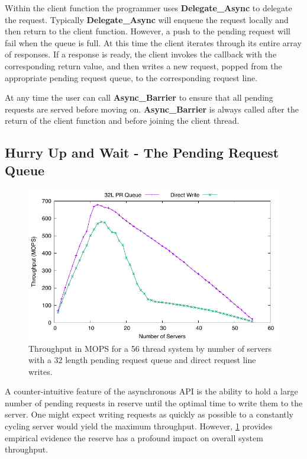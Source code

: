 \documentclass{uicthesi}
\begin{document}
Within the client function the programmer uses \textbf{Delegate\_Async} to delegate the request. Typically \textbf{Delegate\_Async} will enqueue the request locally and then return to the client function. However, a push to the pending request will fail when the queue is full. At this time the client iterates through its entire array of responses. If a response is ready, the client invokes the callback with the corresponding return value, and then writes a new request, popped from the appropriate pending request queue, to the corresponding request line. 

At any time the user can call \textbf{Async\_Barrier} to ensure that all pending requests are served before moving on.  \textbf{Async\_Barrier} is always called after the return of the client function and before joining the client thread. 

\subsection{Hurry Up and Wait - The Pending Request Queue} \label{pr}
\begin{figure}[ht!]
\centering
\includegraphics[width=0.9\columnwidth]{FIG/queue_v_no_queue.pdf}
\caption{Throughput in MOPS for a 56 thread system by number of servers with a 32 length pending request queue and direct request line writes.}
\label{fig:queue_v_no_queue}
\end{figure}

A counter-intuitive feature of the asynchronous API is the ability to hold a large number of pending requests in reserve until the optimal time to write them to the server. One might expect writing requests as quickly as possible to a constantly cycling server would yield the maximum throughput. However, \ref{fig:queue_v_no_queue} provides empirical evidence the reserve has a profound impact on overall system throughput. 
\end{document}
